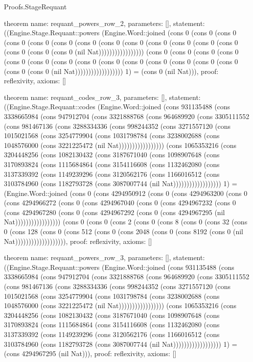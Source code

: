 \begin{lexlean}{Proofs.StageRequant}
\begin{semanticmodule}
theorem{
  name: requant_powers_row_2,
  parameters: [],
  statement: ((Engine.Stage.Requant::powers (Engine.Word::joined (cons 0 (cons 0 (cons 0 (cons 0 (cons 0 (cons 0 (cons 0 (cons 0 (cons 0 (cons 0 (cons 0 (cons 0 (cons 0 (cons 0 (cons 0 (cons 0 (nil Nat))))))))))))))))) (cons 0 (cons 0 (cons 0 (cons 0 (cons 0 (cons 0 (cons 0 (cons 0 (cons 0 (cons 0 (cons 0 (cons 0 (cons 0 (cons 0 (cons 0 (cons 0 (nil Nat)))))))))))))))))) 1) = (cons 0 (nil Nat))),
  proof: reflexivity{},
  axioms: []
}

theorem{
  name: requant_codes_row_3,
  parameters: [],
  statement: ((Engine.Stage.Requant::codes (Engine.Word::joined (cons 931135488 (cons 3338665984 (cons 947912704 (cons 3321888768 (cons 964689920 (cons 3305111552 (cons 981467136 (cons 3288334336 (cons 998244352 (cons 3271557120 (cons 1015021568 (cons 3254779904 (cons 1031798784 (cons 3238002688 (cons 1048576000 (cons 3221225472 (nil Nat))))))))))))))))) (cons 1065353216 (cons 3204448256 (cons 1082130432 (cons 3187671040 (cons 1098907648 (cons 3170893824 (cons 1115684864 (cons 3154116608 (cons 1132462080 (cons 3137339392 (cons 1149239296 (cons 3120562176 (cons 1166016512 (cons 3103784960 (cons 1182793728 (cons 3087007744 (nil Nat)))))))))))))))))) 1) = (Engine.Word::joined (cons 0 (cons 4294950912 (cons 0 (cons 4294963200 (cons 0 (cons 4294966272 (cons 0 (cons 4294967040 (cons 0 (cons 4294967232 (cons 0 (cons 4294967280 (cons 0 (cons 4294967292 (cons 0 (cons 4294967295 (nil Nat))))))))))))))))) (cons 0 (cons 0 (cons 2 (cons 0 (cons 8 (cons 0 (cons 32 (cons 0 (cons 128 (cons 0 (cons 512 (cons 0 (cons 2048 (cons 0 (cons 8192 (cons 0 (nil Nat))))))))))))))))))),
  proof: reflexivity{},
  axioms: []
}

theorem{
  name: requant_powers_row_3,
  parameters: [],
  statement: ((Engine.Stage.Requant::powers (Engine.Word::joined (cons 931135488 (cons 3338665984 (cons 947912704 (cons 3321888768 (cons 964689920 (cons 3305111552 (cons 981467136 (cons 3288334336 (cons 998244352 (cons 3271557120 (cons 1015021568 (cons 3254779904 (cons 1031798784 (cons 3238002688 (cons 1048576000 (cons 3221225472 (nil Nat))))))))))))))))) (cons 1065353216 (cons 3204448256 (cons 1082130432 (cons 3187671040 (cons 1098907648 (cons 3170893824 (cons 1115684864 (cons 3154116608 (cons 1132462080 (cons 3137339392 (cons 1149239296 (cons 3120562176 (cons 1166016512 (cons 3103784960 (cons 1182793728 (cons 3087007744 (nil Nat)))))))))))))))))) 1) = (cons 4294967295 (nil Nat))),
  proof: reflexivity{},
  axioms: []
}
\end{semanticmodule}
\end{lexlean}
